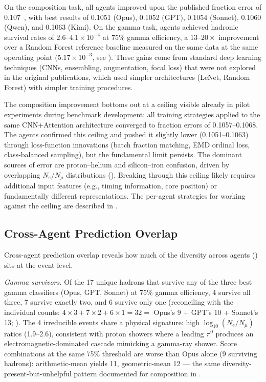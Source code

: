 \documentclass[universe,article,submit,pdftex,oneauthor]{Definitions/mdpi}
\begin{document}
On the composition task, all agents improved upon the published fraction error of 0.107~\cite{kascade_jinst}, with best results of 0.1051 (Opus), 0.1052 (GPT), 0.1054 (Sonnet), 0.1060 (Qwen), and 0.1063 (Kimi). On the gamma task, agents achieved hadronic survival rates of $2.6$--$4.1 \times 10^{-4}$ at 75\% gamma efficiency, a $13$--$20\times$ improvement over a Random Forest reference baseline measured on the same data at the same operating point ($5.17 \times 10^{-3}$, see ). These gains come from standard deep learning techniques (CNNs, ensembling, augmentation, focal loss) that were not explored in the original publications, which used simpler architectures (LeNet, Random Forest) with simpler training procedures.

The composition improvement bottoms out at a ceiling visible already in pilot experiments during benchmark development: all training strategies applied to the same CNN+Attention architecture converged to fraction errors of 0.1057--0.1068. The agents confirmed this ceiling and pushed it slightly lower (0.1051--0.1063) through loss-function innovations (batch fraction matching, EMD ordinal loss, class-balanced sampling), but the fundamental limit persists. The dominant sources of error are proton--helium and silicon--iron confusion, driven by overlapping $N_e/N_\mu$ distributions (). Breaking through this ceiling likely requires additional input features (e.g., timing information, core position) or fundamentally different representations. The per-agent strategies for working against the ceiling are described in .

\subsection{Cross-Agent Prediction Overlap}
\label{sec:overlap}

Cross-agent prediction overlap reveals how much of the diversity across agents () sits at the event level.

\textit{Gamma survivors.} Of the 17 unique hadrons that survive any of the three best gamma classifiers (Opus, GPT, Sonnet) at 75\% gamma efficiency, 4 survive all three, 7 survive exactly two, and 6 survive only one (reconciling with the individual counts: $4 \times 3 + 7 \times 2 + 6 \times 1 = 32 =$ Opus's 9 + GPT's 10 + Sonnet's 13; ). The 4 irreducible events share a physical signature: high $\log_{10}(N_e/N_\mu)$ ratios (1.9--2.6), consistent with proton showers where a leading $\pi^0$ produces an electromagnetic-dominated cascade mimicking a gamma-ray shower. Score combinations at the same 75\% threshold are worse than Opus alone (9 surviving hadrons): arithmetic-mean yields 11, geometric-mean 12 --- the same diversity-present-but-unhelpful pattern documented for composition in .
\end{document}
